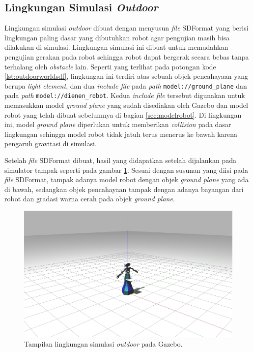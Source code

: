 \subsection{Lingkungan Simulasi \emph{Outdoor}}
\label{subsec:lingkunganoutdoor}

Lingkungan simulasi \emph{outdoor} dibuat dengan menyusun \emph{file} SDFormat yang berisi lingkungan paling dasar yang dibutuhkan robot agar pengujian masih bisa dilakukan di simulasi.
Lingkungan simulasi ini dibuat untuk memudahkan pengujian gerakan pada robot sehingga robot dapat bergerak secara bebas tanpa terhalang oleh \emph{obstacle} lain.
Seperti yang terlihat pada potongan kode \ref{lst:outdoorworldsdf},
  lingkungan ini terdiri atas sebuah objek pencahayaan yang berupa \emph{light element},
  dan dua \emph{include file} pada \emph{path} \lstinline{model://ground_plane} dan pada \emph{path} \lstinline{model://dienen_robot}.
Kedua \emph{include file} tersebut digunakan untuk memasukkan model \emph{ground plane} yang sudah disediakan oleh Gazebo dan model robot yang telah dibuat sebelumnya di bagian \ref{sec:modelrobot}.
Di lingkungan ini, model \emph{ground plane} diperlukan untuk memberikan \emph{collision} pada dasar lingkungan sehingga model robot tidak jatuh terus menerus ke bawah karena pengaruh gravitasi di simulasi.



Setelah \emph{file} SDFormat dibuat,
  hasil yang didapatkan setelah dijalankan pada simulator tampak seperti pada gambar \ref{fig:lingkunganoutdoor}.
Sesuai dengan susunan yang diisi pada \emph{file} SDFormat,
  tampak adanya model robot dengan objek \emph{ground plane} yang ada di bawah,
  sedangkan objek pencahayaan tampak dengan adanya bayangan dari robot dan gradasi warna cerah pada objek \emph{ground plane}.

\begin{figure}[ht]
  \centering
  \includegraphics[scale=0.23]{gambar/lingkungan-outdoor.png}
  \caption{Tampilan lingkungan simulasi \emph{outdoor} pada Gazebo.}
  \label{fig:lingkunganoutdoor}
\end{figure}
